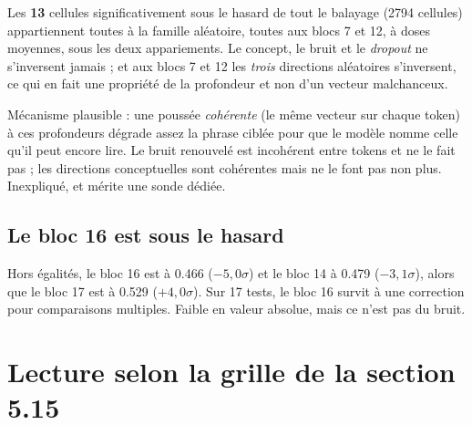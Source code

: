 \documentclass[11pt,a4paper]{article}
\begin{document}
Les \textbf{13} cellules significativement sous le hasard de tout le balayage
(\num{2794} cellules) appartiennent toutes à la famille aléatoire, toutes aux blocs 7 et
12, à doses moyennes, sous les deux appariements. Le concept, le bruit et le
\emph{dropout} ne s'inversent jamais ; et aux blocs 7 et 12 les \emph{trois} directions
aléatoires s'inversent, ce qui en fait une propriété de la profondeur et non d'un vecteur
malchanceux.

Mécanisme plausible : une poussée \emph{cohérente} (le même vecteur sur chaque token) à
ces profondeurs dégrade assez la phrase ciblée pour que le modèle nomme celle qu'il peut
encore lire. Le bruit renouvelé est incohérent entre tokens et ne le fait pas ; les
directions conceptuelles sont cohérentes mais ne le font pas non plus. Inexpliqué, et
mérite une sonde dédiée.

\subsection{Le bloc 16 est sous le hasard}

Hors égalités, le bloc 16 est à \num{0.466} ($-5{,}0\sigma$) et le bloc 14 à \num{0.479}
($-3{,}1\sigma$), alors que le bloc 17 est à \num{0.529} ($+4{,}0\sigma$). Sur 17 tests,
le bloc 16 survit à une correction pour comparaisons multiples. Faible en valeur absolue,
mais ce n'est pas du bruit.

\section{Lecture selon la grille de la section 5.15}
\end{document}
